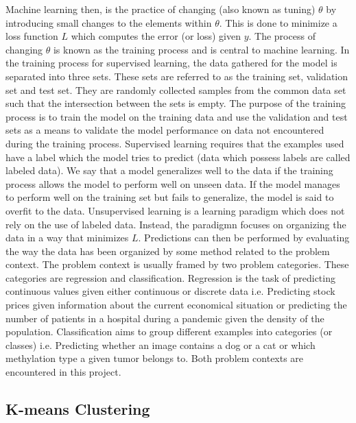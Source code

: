 Machine learning then, is the practice of changing (also known as tuning) $\theta$ by introducing small changes to the elements within $\theta$. This is done to minimize a loss function $L$ which computes the error (or loss) given $y$. The process of changing $\theta$ is known as the training process and is central to machine learning. In the training process for supervised learning, the data gathered for the model is separated into three sets. These sets are referred to as the training set, validation set and test set. They are randomly collected samples from the common data set such that the intersection between the sets is empty. The purpose of the training process is to train the model on the training data and use the validation and test sets as a means to validate the model performance on data not encountered during the training process. Supervised learning requires that the examples used have a label which the model tries to predict (data which possess labels are called labeled data). We say that a model generalizes well to the data if the training process allows the model to perform well on unseen data. If the model manages to perform well on the training set but fails to generalize, the model is said to overfit to the data. Unsupervised learning is a learning paradigm which does not rely on the use of labeled data. Instead, the paradigmn focuses on organizing the data in a way that minimizes $L$. Predictions can then be performed by evaluating the way the data has been organized by some method related to the problem context. The problem context is usually framed by two problem categories. These categories are regression and classification. Regression is the task of predicting continuous values given either continuous or discrete data i.e. Predicting stock prices given information about the current economical situation or predicting the number of patients in a hospital during a pandemic given the density of the population. Classification aims to group different examples into categories (or classes) i.e. Predicting whether an image contains a dog or a cat or which methylation type a given tumor belongs to. Both problem contexts are encountered in this project.


\subsection{K-means Clustering}


